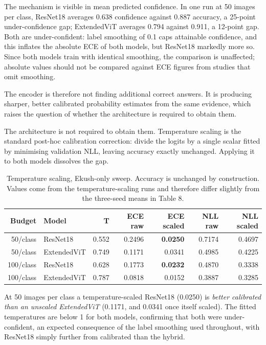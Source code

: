 The mechanism is visible in mean predicted confidence. In one run at 50 images per class, ResNet18 averages 0.638 confidence against 0.887 accuracy, a
25-point under-confidence gap; ExtendedViT averages 0.794 against 0.911,
a 12-point gap. Both are under-confident: label smoothing of 0.1 caps
attainable confidence, and this inflates the absolute ECE of both models,
but ResNet18 markedly more so. Since both models train with
identical smoothing, the comparison is unaffected; absolute values
should not be compared against ECE figures from studies that omit
smoothing.

The encoder is therefore not finding additional correct answers. It is
producing sharper, better calibrated probability estimates from the same
evidence, which raises the question of whether the architecture is
required to obtain them.

The architecture is not required to obtain them. Temperature scaling \citep{ref48} is the standard
post-hoc calibration correction: divide the logits by a single scalar
fitted by minimising validation NLL, leaving accuracy exactly unchanged.
Applying it to both models dissolves the gap.

\begin{table}[htbp]
\centering
\footnotesize
\caption{Temperature scaling, Ekush-only sweep. Accuracy is unchanged by construction. Values come from the temperature-scaling runs and therefore differ slightly from the three-seed means in Table 8.}
\begin{tabular}{rlrrrrr}
\toprule
Budget & Model & T & ECE raw & ECE scaled & NLL raw & NLL scaled \\
\midrule
50/class & ResNet18 & 0.552 & 0.2496 & \textbf{0.0250} & 0.7174 &
0.4697 \\
50/class & Extended\-Vi\-T & 0.749 & 0.1171 & 0.0341 & 0.4985 & 0.4225 \\
100/class & ResNet18 & 0.628 & 0.1773 & \textbf{0.0232} & 0.4870 &
0.3338 \\
100/class & Extended\-Vi\-T & 0.787 & 0.0818 & 0.0152 & 0.3887 & 0.3285 \\
\bottomrule
\end{tabular}
\end{table}


At 50 images per class a temperature-scaled ResNet18 (0.0250) is
\emph{better calibrated than an unscaled ExtendedViT} (0.1171, and
0.0341 once itself scaled). The fitted temperatures are below 1 for both
models, confirming that both were under-confident, an expected
consequence of the label smoothing used throughout, with ResNet18
simply further from calibrated than the hybrid.

